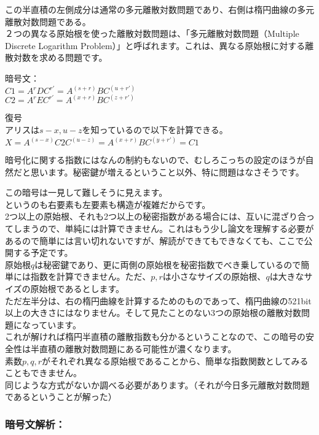 \documentclass[
]{article}
\begin{document}
この半直積の左側成分は通常の多元離散対数問題であり、右側は楕円曲線の多元離散対数問題である。\\
２つの異なる原始根を使った離散対数問題は、「多元離散対数問題（Multiple
Discrete Logarithm
Problem）」と呼ばれます。これは、異なる原始根に対する離散対数を求める問題です。

暗号文：\\
\(C1=A^rDC^{r'}=A^{(s+r)}BC^{(u+r')}\)\\
\(C2=A^rEC^{r'}=A^{(x+r)}BC^{(z+r')}\)

復号\\
アリスは\(s-x,u-z\)を知っているので以下を計算できる。\\
\(X=A^{(s-x)}C2C^{(u-z)}=A^{(x+r)}BC^{(y+r')}=C1\)

暗号化に関する指数にはなんの制約もないので、むしろこっちの設定のほうが自然だと思います。秘密鍵が増えるということ以外、特に問題はなさそうです。

この暗号は一見して難しそうに見えます。\\
というのも右要素も左要素も構造が複雑だからです。\\
2つ以上の原始根、それも2つ以上の秘密指数がある場合には、互いに混ざり合ってしまうので、単純には計算できません。これはもう少し論文を理解する必要があるので簡単には言い切れないですが、解読ができてもできなくても、ここで公開する予定です。\\
原始根\(q\)は秘密鍵であり、更に両側の原始根を秘密指数でべき乗しているので簡単には指数を計算できません。ただ、\(p,r\)は小さなサイズの原始根、\(q\)は大きなサイズの原始根であるとします。\\
ただ左半分は、右の楕円曲線を計算するためのものであって、楕円曲線の521bit以上の大きさにはなりません。そして見たことのない3つの原始根の離散対数問題になっています。\\
これが解ければ楕円半直積の離散指数も分かるということなので、この暗号の安全性は半直積の離散対数問題にある可能性が濃くなります。\\
素数\(p,q,r\)がそれぞれ異なる原始根であることから、簡単な指数関数としてみることもできません。\\
同じような方式がないか調べる必要があります。（それが今日多元離散対数問題であるということが解った）

\hypertarget{ux6697ux53f7ux6587ux89e3ux6790}{%
\subsubsection{暗号文解析：}\label{ux6697ux53f7ux6587ux89e3ux6790}}
\end{document}
